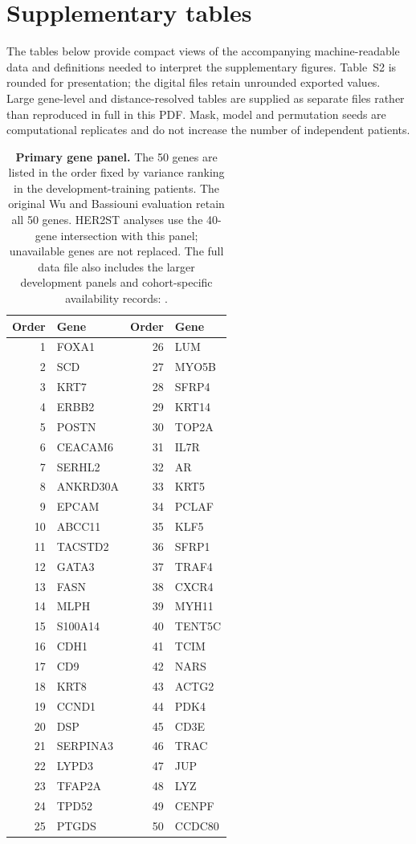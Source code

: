 \section{Supplementary tables}
The tables below provide compact views of the accompanying machine-readable data and definitions needed to interpret the supplementary figures. Table~S2 is rounded for presentation; the digital files retain unrounded exported values. Large gene-level and distance-resolved tables are supplied as separate files rather than reproduced in full in this PDF. Mask, model and permutation seeds are computational replicates and do not increase the number of independent patients.
\begin{table}[htbp]
\caption{\textbf{Primary gene panel.} The 50 genes are listed in the order fixed by variance ranking in the development-training patients. The original Wu and Bassiouni evaluation retain all 50 genes. HER2ST analyses use the 40-gene intersection with this panel; unavailable genes are not replaced. The full data file also includes the larger development panels and cohort-specific availability records: \protect{}.}
\label{tab:primary_gene_panel}
\centering\small
\begin{tabular}{rlrl}\toprule
Order & Gene & Order & Gene\\\midrule
1 & FOXA1 & 26 & LUM \\
2 & SCD & 27 & MYO5B \\
3 & KRT7 & 28 & SFRP4 \\
4 & ERBB2 & 29 & KRT14 \\
5 & POSTN & 30 & TOP2A \\
6 & CEACAM6 & 31 & IL7R \\
7 & SERHL2 & 32 & AR \\
8 & ANKRD30A & 33 & KRT5 \\
9 & EPCAM & 34 & PCLAF \\
10 & ABCC11 & 35 & KLF5 \\
11 & TACSTD2 & 36 & SFRP1 \\
12 & GATA3 & 37 & TRAF4 \\
13 & FASN & 38 & CXCR4 \\
14 & MLPH & 39 & MYH11 \\
15 & S100A14 & 40 & TENT5C \\
16 & CDH1 & 41 & TCIM \\
17 & CD9 & 42 & NARS \\
18 & KRT8 & 43 & ACTG2 \\
19 & CCND1 & 44 & PDK4 \\
20 & DSP & 45 & CD3E \\
21 & SERPINA3 & 46 & TRAC \\
22 & LYPD3 & 47 & JUP \\
23 & TFAP2A & 48 & LYZ \\
24 & TPD52 & 49 & CENPF \\
25 & PTGDS & 50 & CCDC80 \\
\bottomrule\end{tabular}\end{table}\clearpage
